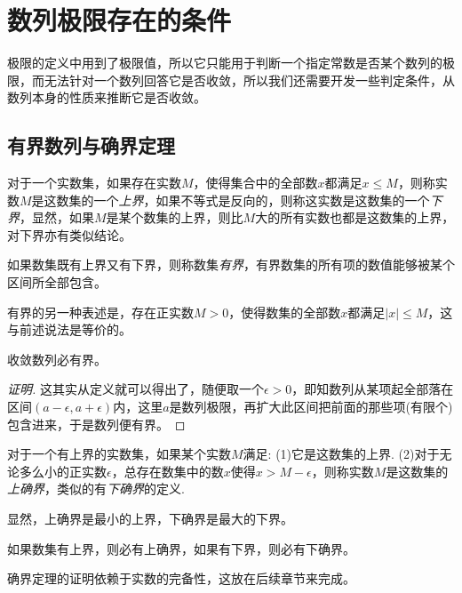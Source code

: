 
\section{数列极限存在的条件}
\label{sec:condition-of-limit-exists}

极限的定义中用到了极限值，所以它只能用于判断一个指定常数是否某个数列的极限，而无法针对一个数列回答它是否收敛，所以我们还需要开发一些判定条件，从数列本身的性质来推断它是否收敛。

\subsection{有界数列与确界定理}
\label{sec:bound-number-sequence}

对于一个实数集，如果存在实数$M$，使得集合中的全部数$x$都满足$x \leqslant M$，则称实数$M$是这数集的一个\emph{上界}，如果不等式是反向的，则称这实数是这数集的一个\emph{下界}，显然，如果$M$是某个数集的上界，则比$M$大的所有实数也都是这数集的上界，对下界亦有类似结论。

如果数集既有上界又有下界，则称数集\emph{有界}，有界数集的所有项的数值能够被某个区间所全部包含。

有界的另一种表述是，存在正实数$M>0$，使得数集的全部数$x$都满足$|x| \leqslant M$，这与前述说法是等价的。

\begin{theorem}[收敛数列的有界性]
  收敛数列必有界。
\end{theorem}

\begin{proof}[证明]
  这其实从定义就可以得出了，随便取一个$\epsilon>0$，即知数列从某项起全部落在区间$(a-\epsilon, a+\epsilon)$内，这里$a$是数列极限，再扩大此区间把前面的那些项(有限个)包含进来，于是数列便有界。
\end{proof}

\begin{definition}
对于一个有上界的实数集，如果某个实数$M$满足: (1)它是这数集的上界. (2)对于无论多么小的正实数$\epsilon$，总存在数集中的数$x$使得$x>M-\epsilon$，则称实数$M$是这数集的\emph{上确界}，类似的有\emph{下确界}的定义.
\end{definition}

显然，上确界是最小的上界，下确界是最大的下界。

\begin{theorem}[确界定理]
  如果数集有上界，则必有上确界，如果有下界，则必有下确界。
\end{theorem}

确界定理的证明依赖于实数的完备性，这放在后续章节来完成。

